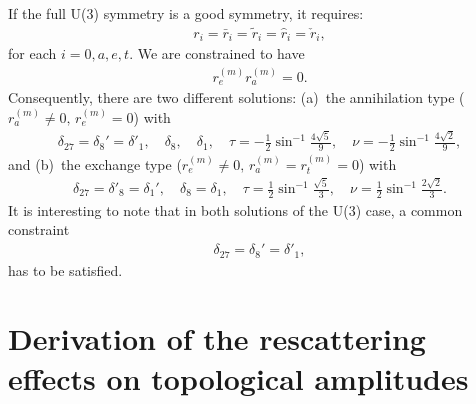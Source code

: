 \documentclass[aps,preprint,floats,epsf,epsfig,nofootinbib,letter]{revtex4}
\newcommand{\be}{\begin{eqnarray}}
\newcommand{\en}{\end{eqnarray}}
\begin{document}
If the full U(3) symmetry is a good symmetry,
it requires:
 \be
 r_i=\bar r_i=\tilde r_i=\hat r_i=\check r_i,
 \en
for each $i=0,a,e,t$. 
We are constrained to have 
 \be
 r^{(m)}_e r^{(m)}_a=0.
 \en
Consequently, there are two different solutions:
%
(a)~the annihilation type ($r^{(m)}_a\neq0,\,r^{(m)}_e=0$) with
 \be
 \delta_{27}=\delta_8'=\delta'_1,
 \quad
 \delta_8,%
 \quad
 \delta_1,%
 \quad
 \tau=-\frac{1}{2} \sin^{-1}\frac{4\sqrt5}{9},
 \quad
 \nu=-\frac{1}{2}\sin^{-1}\frac{4\sqrt2}{9},
 \label{eq:solutionreU3ra}
 \en
%
and (b)~the exchange type ($r^{(m)}_e\neq0,\,r^{(m)}_a=r^{(m)}_t=0$)
with
%
 \be
 \delta_{27}=\delta'_8=\delta_1',
 \quad
 \delta_8=\delta_1,%
 \quad
 \tau=\frac{1}{2} \sin^{-1}\frac{\sqrt5}{3},
 \quad
 \nu=\frac{1}{2}\sin^{-1}\frac{2\sqrt2}{3}.
 \label{eq:solutionreU3re}
 \en
It is interesting to note that in both solutions of the U(3) case,
a common constraint
 \be
  \delta_{27}=\delta_8'=\delta'_1,
  \label{eq:constrain}
 \en
has to be satisfied. 



\section{Derivation of the rescattering effects on topological amplitudes} %
\end{document}
